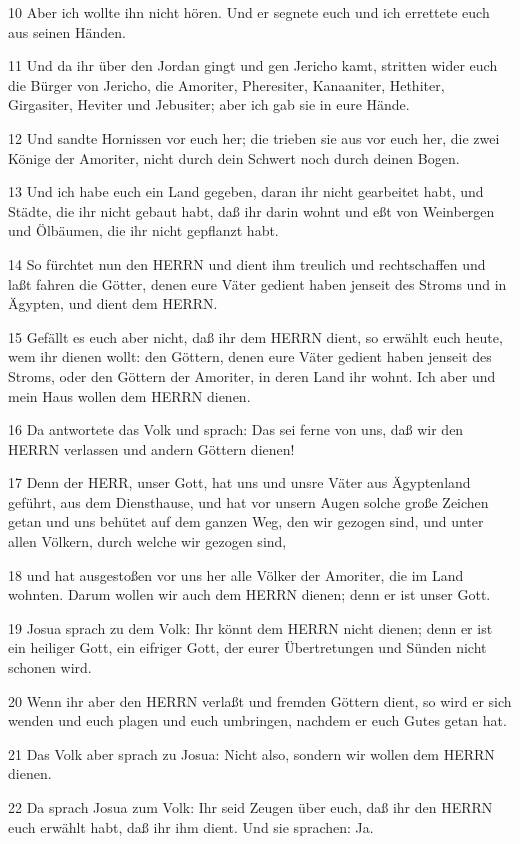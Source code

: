 \par 10 Aber ich wollte ihn nicht hören. Und er segnete euch und ich errettete euch aus seinen Händen.
\par 11 Und da ihr über den Jordan gingt und gen Jericho kamt, stritten wider euch die Bürger von Jericho, die Amoriter, Pheresiter, Kanaaniter, Hethiter, Girgasiter, Heviter und Jebusiter; aber ich gab sie in eure Hände.
\par 12 Und sandte Hornissen vor euch her; die trieben sie aus vor euch her, die zwei Könige der Amoriter, nicht durch dein Schwert noch durch deinen Bogen.
\par 13 Und ich habe euch ein Land gegeben, daran ihr nicht gearbeitet habt, und Städte, die ihr nicht gebaut habt, daß ihr darin wohnt und eßt von Weinbergen und Ölbäumen, die ihr nicht gepflanzt habt.
\par 14 So fürchtet nun den HERRN und dient ihm treulich und rechtschaffen und laßt fahren die Götter, denen eure Väter gedient haben jenseit des Stroms und in Ägypten, und dient dem HERRN.
\par 15 Gefällt es euch aber nicht, daß ihr dem HERRN dient, so erwählt euch heute, wem ihr dienen wollt: den Göttern, denen eure Väter gedient haben jenseit des Stroms, oder den Göttern der Amoriter, in deren Land ihr wohnt. Ich aber und mein Haus wollen dem HERRN dienen.
\par 16 Da antwortete das Volk und sprach: Das sei ferne von uns, daß wir den HERRN verlassen und andern Göttern dienen!
\par 17 Denn der HERR, unser Gott, hat uns und unsre Väter aus Ägyptenland geführt, aus dem Diensthause, und hat vor unsern Augen solche große Zeichen getan und uns behütet auf dem ganzen Weg, den wir gezogen sind, und unter allen Völkern, durch welche wir gezogen sind,
\par 18 und hat ausgestoßen vor uns her alle Völker der Amoriter, die im Land wohnten. Darum wollen wir auch dem HERRN dienen; denn er ist unser Gott.
\par 19 Josua sprach zu dem Volk: Ihr könnt dem HERRN nicht dienen; denn er ist ein heiliger Gott, ein eifriger Gott, der eurer Übertretungen und Sünden nicht schonen wird.
\par 20 Wenn ihr aber den HERRN verlaßt und fremden Göttern dient, so wird er sich wenden und euch plagen und euch umbringen, nachdem er euch Gutes getan hat.
\par 21 Das Volk aber sprach zu Josua: Nicht also, sondern wir wollen dem HERRN dienen.
\par 22 Da sprach Josua zum Volk: Ihr seid Zeugen über euch, daß ihr den HERRN euch erwählt habt, daß ihr ihm dient. Und sie sprachen: Ja.
